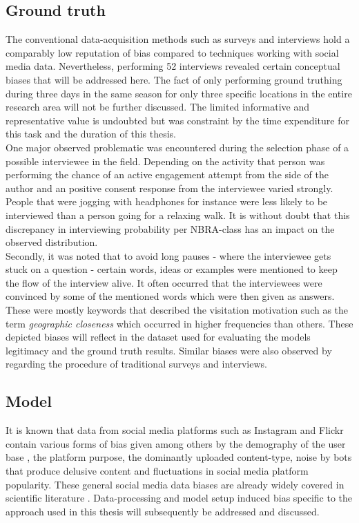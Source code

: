 \subsection{Ground truth}
The conventional data-acquisition methods such as surveys and interviews hold a comparably low reputation of bias compared to techniques working with social media data. Nevertheless, performing 52 interviews revealed certain conceptual biases that will be addressed here. The fact of only performing ground truthing during three days in the same season for only three specific locations in the entire research area will not be further discussed. The limited informative and representative value is undoubted but was constraint by the time expenditure for this task and the duration of this thesis. \\
One major observed problematic was encountered during the selection phase of a possible interviewee in the field. Depending on the activity that person was performing the chance of an active engagement attempt from the side of the author and an positive consent response from the interviewee varied strongly. People that were jogging with headphones for instance were less likely to be interviewed than a person going for a relaxing walk. It is without doubt that this discrepancy in interviewing probability per NBRA-class has an impact on the observed distribution.\\
Secondly, it was noted that to avoid long pauses - where the interviewee gets stuck on a question - certain words, ideas or examples were mentioned to keep the flow of the interview alive. It often occurred that the interviewees were convinced by some of the mentioned words which were then given as answers. These were mostly keywords that described the visitation motivation such as the term \textit{geographic closeness} which occurred in higher frequencies than others. These depicted biases will reflect in the dataset used for evaluating the models legitimacy and the ground truth results. Similar biases were also observed by \textcite{Hanemann2011, Kling2012, Tenerelli2016} regarding the procedure of traditional surveys and interviews.

\subsection{Model}
It is known that data from social media platforms such as Instagram and Flickr contain various forms of bias given among others by the demography of the user base \parencite{Heikinheimo2017}, the platform purpose, the dominantly uploaded content-type, noise by bots that produce delusive content \parencite{Edwards2014} and fluctuations in social media platform popularity. These general social media data biases are already widely covered in scientific literature \parencite{Ruths2014, Lazer2014, Zook2017}. Data-processing and model setup induced bias specific to the approach used in this thesis will subsequently be addressed and discussed. \\

